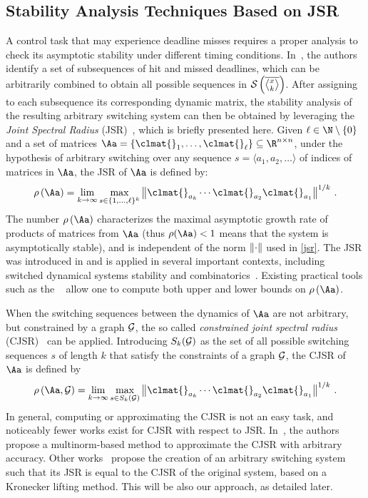 \subsection{Stability Analysis Techniques Based on JSR}
\label{sec:existing}
A control task that may experience deadline misses requires a proper analysis to check its asymptotic stability under different timing conditions. 
In~\cite{Maggio:2020}, the authors identify a set of subsequences of hit and missed deadlines, which can be arbitrarily combined to obtain all possible sequences in $\sset{}{\rowmiss{}}$.
After assigning to each subsequence its corresponding dynamic matrix, the stability analysis of the resulting arbitrary switching system can then be obtained by leveraging the \emph{Joint Spectral Radius} (JSR)~\cite{Jungers2009}, which is briefly presented here.
%
Given $\ell\in\N\setminus \left\{ 0 \right\} $ and a set of matrices $\Aa = \{\clmat{}_1, \ldots, \clmat{}_\ell \} \subseteq \R^{n\times n}$, under the hypothesis of arbitrary switching over any sequence $s=\langle a_1,a_2,\dots \rangle$ of indices of matrices in $\Aa$, the JSR of $\Aa$ is defined by:
\begin{equation}
    \label{jsr}
    \rho\left(\Aa\right)= \lim_{k\rightarrow\infty} \max_{s\in\{1,\ldots,\ell\}^k} \norm{\clmat{}_{a_k} \cdots \clmat{}_{a_2}\clmat{}_{a_1}}^{1/k} \,.
\end{equation}
The number $\rho\left(\Aa\right)$ characterizes the maximal asymptotic growth rate of products of matrices from $\Aa$ (thus  $\rho(\Aa)<1$ means that the system is asymptotically stable), and is independent of the norm $\left\lVert\cdot\right\rVert$ used in \eqref{jsr}.
%
The JSR was introduced in \cite{rota} and is applied in several important contexts, including switched dynamical systems stability and combinatorics~\cite{Jungers2009}.
Existing practical tools such as the ~\cite{vankeerberghen2014jsr} allow one to compute both upper and lower bounds on $\rho\left(\Aa\right)$.

When the switching sequences between the dynamics of $\Aa$ are not arbitrary, but constrained by a graph $\mathcal{G}_{}$, the so called \emph{constrained joint spectral radius} (CJSR)~\cite{dai2012gelfand} can be applied.
Introducing ${S}_k(\mathcal{G}_{})$ as the set of all possible switching sequences $s$ of length $k$ that satisfy the constraints of a graph $\mathcal{G}_{}$, the CJSR of $\Aa$ is defined by
\begin{equation}
\label{cjsr}
    \rho\left(\Aa,\GG{}\right)= \lim_{k\rightarrow\infty} \max_{s\in{S}_k(\GG{})} \norm{\clmat{}_{a_k} \cdots \clmat{}_{a_2}\clmat{}_{a_1}}^{1/k} \,.
\end{equation}
In general, computing or approximating the CJSR is not an easy task, and noticeably fewer works exist for CJSR with respect to JSR.
In~\cite{philippe2016stability}, the authors propose a multinorm-based method to approximate the CJSR with arbitrary accuracy.
Other works~\cite{kozyakin2014berger, wang2014stability, xu2020approximation} propose the creation of an arbitrary switching system such that its JSR is equal to the CJSR of the original system, based on a Kronecker lifting method.
This will be also our approach, as detailed later.

